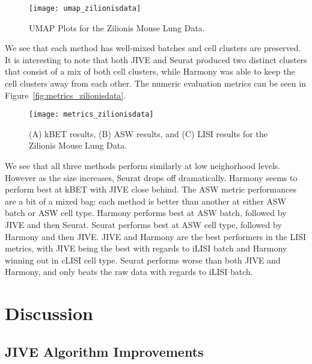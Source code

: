 \documentclass[
12pt, %
letterpaper, %
oneside, %
headinclude,footinclude, %
BCOR5mm, %
]{scrartcl}
\begin{document}
\begin{figure}[H]
    \centering 
    \texttt{[image: umap\_zilionisdata]} 
    \caption[UMAP Plots for the Zilionis Mouse Lung Data]{UMAP Plots for the Zilionis Mouse Lung Data.}
    \label{fig:umap_zilionisdata} 
\end{figure}

We see that each method has well-mixed batches and cell clusters are preserved. It is interesting to note that both JIVE and Seurat produced two distinct clusters that consist of a mix of both cell clusters, while Harmony was able to keep the cell clusters away from each other. The numeric evaluation metrics can be seen in Figure~\vref{fig:metrics_zilionisdata}.

\begin{figure}[H]
    \centering 
    \texttt{[image: metrics\_zilionisdata]} 
    \caption[Metrics for the Zilionis Mouse Lung Data]{(A) kBET results, (B) ASW results, and (C) LISI results for the Zilionis Mouse Lung Data.}
    \label{fig:metrics_zilionisdata} 
\end{figure}

We see that all three methods perform similarly at low neighorhood levels. However as the size increases, Seurat drops off dramatically. Harmony seems to perform best at kBET with JIVE close behind. The ASW metric performances are a bit of a mixed bag: each method is better than another at either ASW batch or ASW cell type. Harmony performs best at ASW batch, followed by JIVE and then Seurat. Seurat performs best at ASW cell type, followed by Harmony and then JIVE. JIVE and Harmony are the best performers in the LISI metrics, with JIVE being the best with regards to iLISI batch and Harmony winning out in cLISI cell type. Seurat performs worse than both JIVE and Harmony, and only beats the raw data with regards to iLISI batch.


\section{Discussion}




\subsection{JIVE Algorithm Improvements}
\end{document}
